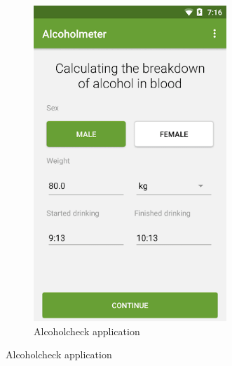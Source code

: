 \begin{figure}[H]
\begin{subfigure}{0.3\textwidth}
      \includegraphics[width=0.8\textwidth]{./img/Alcoholcheck.png}
      \caption{Alcoholcheck \cite{alcoholcheck} application}
      \label{Alcoholcheck}
  \end{subfigure}



\end{figure}

